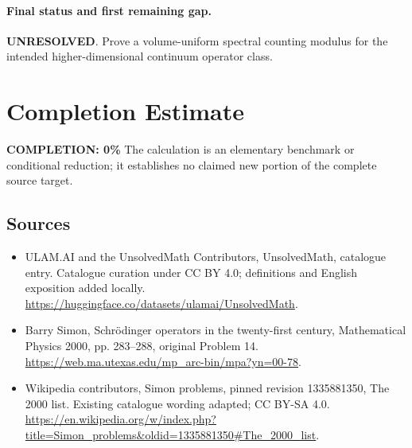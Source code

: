 \documentclass[11pt]{article}
\begin{document}
\paragraph{Final status and first remaining gap.}
\textbf{UNRESOLVED}. Prove a volume-uniform spectral counting modulus for the intended higher-dimensional continuum operator class.

\section{Completion Estimate}
\noindent\textbf{COMPLETION: 0\%}
The calculation is an elementary benchmark or conditional reduction; it establishes no claimed new portion of the complete source target.

\subsection{Sources}
\begin{itemize}
\item[\hypertarget{source:statement:1}{S1}] ULAM.AI and the UnsolvedMath Contributors, UnsolvedMath, catalogue entry. Catalogue curation under CC BY 4.0; definitions and English exposition added locally.
\url{https://huggingface.co/datasets/ulamai/UnsolvedMath}.
\item[\hypertarget{source:statement:2}{S2}] Barry Simon, Schrödinger operators in the twenty-first century, Mathematical Physics 2000, pp. 283–288, original Problem 14.
\url{https://web.ma.utexas.edu/mp_arc-bin/mpa?yn=00-78}.
\item[\hypertarget{source:statement:3}{S3}] Wikipedia contributors, Simon problems, pinned revision 1335881350, The 2000 list. Existing catalogue wording adapted; CC BY-SA 4.0.
\url{https://en.wikipedia.org/w/index.php?title=Simon_problems&oldid=1335881350#The_2000_list}.
\end{itemize}
\label{end:statement}
\end{document}
